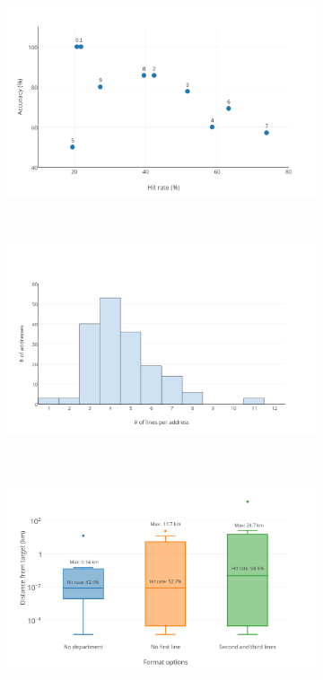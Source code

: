 \documentclass[Report.tex]{subfiles}
\begin{document}
\begin{figure}[h!]
	\begin{subfigure}{1\textwidth}
		\includegraphics[width=\textwidth]{../lib/images/geocode_performance_scatter}
	\end{subfigure}\\
	\begin{subfigure}{1\textwidth}
		\includegraphics[width=\textwidth]{../lib/images/address-lines-histogram}
	\end{subfigure} \\
	\begin{subfigure}{1\textwidth}
		\includegraphics[width=\textwidth]{../lib/images/distance-boxes}
	\end{subfigure} \\
	\label{fig:geoplots}
\end{figure}
\end{document}
